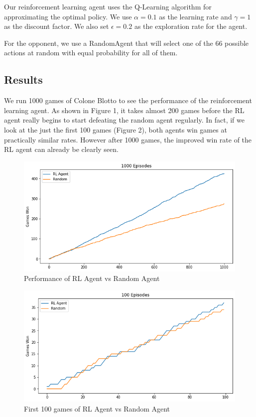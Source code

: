 \documentclass[11pt, oneside]{article}   	%
\begin{document}
\hfill

Our reinforcement learning agent uses the Q-Learning algorithm for approximating the optimal policy. We use $\alpha=0.1$ as the learning rate and $\gamma=1$ as the discount factor. We also set $\epsilon=0.2$ as the exploration rate for the agent.

\hfill

For the opponent, we use a RandomAgent that will select one of the 66 possible actions at random with equal probability for all of them.

\subsection{Results}

We run 1000 games of Colone Blotto to see the performance of the reinforcement learning agent. As shown in Figure 1, it takes almost 200 games before the RL agent really begins to start defeating the random agent regularly. In fact, if we look at the just the first 100 games (Figure 2), both agents win games at practically similar rates. However after 1000 games, the improved win rate of the RL agent can already be clearly seen.

\begin{figure}[h]
    \centering
    \includegraphics[scale=0.5]{./images/rl_random.png}
    \caption{Performance of RL Agent vs Random Agent}
    \label{fig:mesh1}
\end{figure}

\begin{figure}[h]
    \centering
    \includegraphics[scale=0.5]{./images/rl_random100.png}
    \caption{First 100 games of RL Agent vs Random Agent}
    \label{fig:mesh1}
\end{figure}
\end{document}
